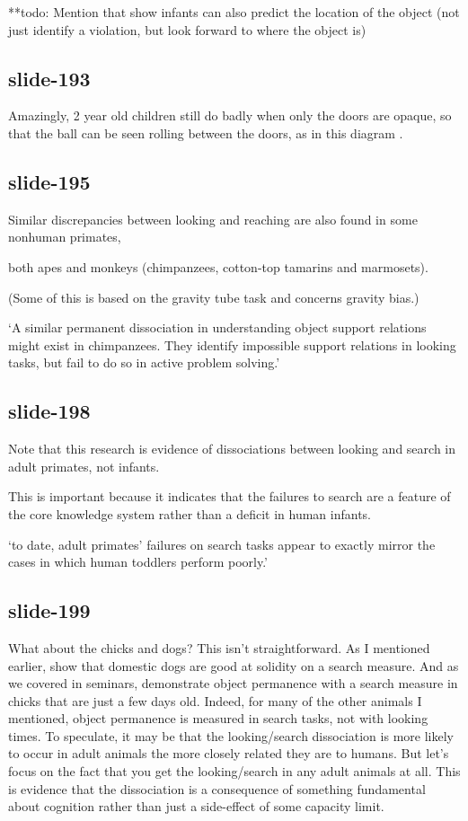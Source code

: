 \documentclass[12pt,\papersize]{extarticle}
\begin{document}
**todo: Mention that \citep{mash:2006_what} show infants can also predict the location of the object (not just identify a violation, but look forward to where the object is)
 
\subsection{slide-193}
Amazingly, 2 year old children still do badly when only the doors are opaque, so that the
ball can be seen rolling between the doors, as in this diagram \citep{Butler:2002bv}.
 
\subsection{slide-195}
Similar discrepancies between looking and reaching are also found in some nonhuman primates,
 
both apes and monkeys (chimpanzees, cotton-top tamarins and marmosets).
 
(Some of this is based on the gravity tube task and concerns gravity bias.)
 
‘A similar permanent dissociation in understanding object support relations  
might exist in chimpanzees. They identify impossible support relations in looking tasks, 
but fail to do so in active problem solving.’
\citep{gomez:2005_species}
 
\subsection{slide-198}
Note that this research is evidence of dissociations between looking and search in adult primates, not infants.
 
This is important because it indicates that the failures to search are a feature of the core knowledge system rather than a deficit in human infants.
 
‘to date, adult primates’ failures on search tasks appear to 
exactly mirror the cases in which human toddlers perform poorly.’
\citep[p.\ 17]{santos:2009_object}
 
\subsection{slide-199}
What about the chicks and dogs?
This isn't straightforward.
As I mentioned earlier, \citep{kundey:2010_domesticated} show that domestic dogs are good 
at solidity on a search measure.  And as we covered in seminars, 
\citep{chiandetti:2011_chicks_op} demonstrate object permanence with a search measure in 
chicks that are just a few days old.
Indeed, for many of the other animals I mentioned, object permanence is measured in search 
tasks, not with looking times.
To speculate, it may be that the looking/search dissociation is more likely to occur in
adult animals the more closely related they are to humans.
But let's focus on the fact that you get the looking/search in any adult animals at all.
This is evidence that the dissociation is a consequence of something fundamental about 
cognition rather than just a side-effect of some capacity limit.
 
\end{document}
